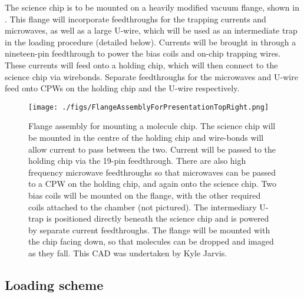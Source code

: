 The science chip is to be mounted on a heavily modified vacuum flange, shown in
. This flange will incorporate feedthroughs for
the trapping currents and microwaves, as well as a large U-wire, which will be
used as an intermediate trap in the loading procedure (detailed below). Currents
will be brought in through a nineteen-pin feedthrough  to power the bias coils
and on-chip trapping wires. These currents will feed onto a holding chip, which
will then connect to the science chip via wirebonds. Separate feedthroughs for
the microwaves and U-wire  feed onto CPWs on the
holding chip and the U-wire respectively.

\begin{figure}[ht]
  \texttt{[image: ./figs/FlangeAssemblyForPresentationTopRight.png]}
  \caption{
    Flange assembly for mounting a molecule chip. The science chip will be
    mounted in the centre of the holding chip and wire-bonds will allow current
    to pass between the two. Current will be passed to the holding chip via the
    19-pin feedthrough. There are also high frequency microwave feedthroughs so
    that microwaves can be passed to a CPW on the holding chip, and again onto
    the science chip. Two bias coils will be mounted on the flange, with the
    other required coils attached to the chamber (not pictured). The
    intermediary U-trap is positioned directly beneath the science chip and is
    powered by separate current feedthroughs. The flange will be mounted with
    the chip facing down, so that molecules can be dropped and imaged as they
    fall. This CAD was undertaken by Kyle Jarvis.
  }
  \label{experiment:fig:flange}
\end{figure}


\subsection{Loading scheme}
\label{experiment:loading}

